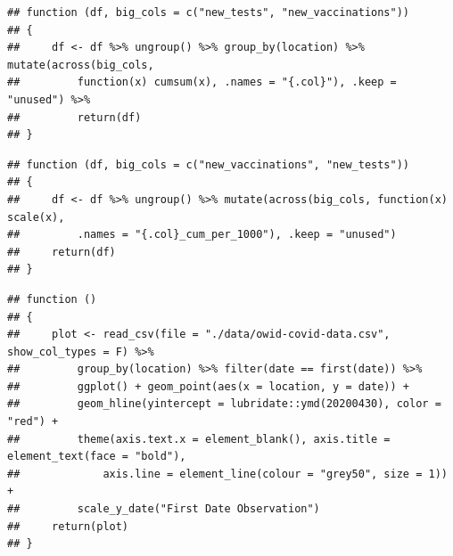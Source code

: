 \documentclass[11pt,preprint, authoryear]{elsarticle}
\numberwithin{equation}{section}
\numberwithin{figure}{section}
\numberwithin{table}{section}
\begin{document}
\begin{verbatim}
## function (df, big_cols = c("new_tests", "new_vaccinations")) 
## {
##     df <- df %>% ungroup() %>% group_by(location) %>% mutate(across(big_cols, 
##         function(x) cumsum(x), .names = "{.col}"), .keep = "unused") %>% 
##         return(df)
## }
\end{verbatim}

\begin{verbatim}
## function (df, big_cols = c("new_vaccinations", "new_tests")) 
## {
##     df <- df %>% ungroup() %>% mutate(across(big_cols, function(x) scale(x), 
##         .names = "{.col}_cum_per_1000"), .keep = "unused")
##     return(df)
## }
\end{verbatim}

\begin{verbatim}
## function () 
## {
##     plot <- read_csv(file = "./data/owid-covid-data.csv", show_col_types = F) %>% 
##         group_by(location) %>% filter(date == first(date)) %>% 
##         ggplot() + geom_point(aes(x = location, y = date)) + 
##         geom_hline(yintercept = lubridate::ymd(20200430), color = "red") + 
##         theme(axis.text.x = element_blank(), axis.title = element_text(face = "bold"), 
##             axis.line = element_line(colour = "grey50", size = 1)) + 
##         scale_y_date("First Date Observation")
##     return(plot)
## }
\end{verbatim}


\end{document}
